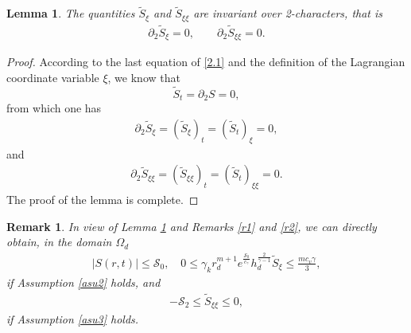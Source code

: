 \documentclass[11pt,reqno]{article}
\newtheorem{lem}{Lemma}[section]
\newtheorem{rem}{Remark}
\newcommand{\fr}{\frac}
\newcommand{\pa}{\partial}
\numberwithin{equation}{section}
\begin{document}
\begin{lem}\label{lem2}
The quantities $\widetilde{S}_\xi$ and $\widetilde{S}_{\xi\xi}$ are invariant over 2-characters, that is
\begin{align}\label{4.1}
\pa_2\widetilde{S}_\xi=0,\qquad \pa_2\widetilde{S}_{\xi\xi}=0.
\end{align}
\end{lem}
\begin{proof}
According to the last equation of \eqref{2.1} and
the definition of the Lagrangian coordinate variable $\xi$, we know that
$$
\widetilde{S}_t=\pa_2S=0,
$$
from which one has
\begin{align*}
\pa_2\widetilde{S}_\xi=(\widetilde{S}_\xi)_t=(\widetilde{S}_t)_\xi=0,
\end{align*}
and
\begin{align*}
\pa_2\widetilde{S}_{\xi\xi}=(\widetilde{S}_{\xi\xi})_t=(\widetilde{S}_t)_{\xi\xi}=0.
\end{align*}
The proof of the lemma is complete.
\end{proof}
\begin{rem}\label{r5}
In view of Lemma \ref{lem2} and Remarks \ref{r1} and \ref{r2}, we can directly obtain, in the domain $\Omega_d$
\begin{align}\label{4.2}
|S(r,t)|\leq \mathcal{S}_0,\quad 0\leq \gamma_k r_{d}^{m+1}e^{\fr{\mathcal{S}_0}{c_\gamma}}h_{d}^{\fr{2}{\gamma-1}}\widetilde{S}_\xi\leq \fr{mc_v\gamma}{3},
\end{align}
if Assumption \ref{asu2} holds, and
\begin{align}\label{4.3}
-\mathcal{S}_2\leq \widetilde{S}_{\xi\xi}\leq0,
\end{align}
if Assumption \ref{asu3} holds.
\end{rem}
\end{document}
